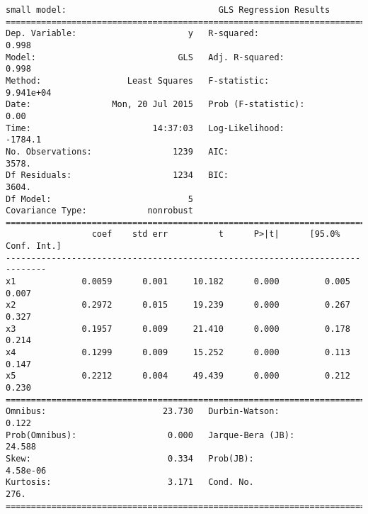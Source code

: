 \documentclass{article}
\begin{document}
\begin{verbatim}
small model:                              GLS Regression Results                            
==============================================================================
Dep. Variable:                      y   R-squared:                       0.998
Model:                            GLS   Adj. R-squared:                  0.998
Method:                 Least Squares   F-statistic:                 9.941e+04
Date:                Mon, 20 Jul 2015   Prob (F-statistic):               0.00
Time:                        14:37:03   Log-Likelihood:                -1784.1
No. Observations:                1239   AIC:                             3578.
Df Residuals:                    1234   BIC:                             3604.
Df Model:                           5                                         
Covariance Type:            nonrobust                                         
==============================================================================
                 coef    std err          t      P>|t|      [95.0% Conf. Int.]
------------------------------------------------------------------------------
x1             0.0059      0.001     10.182      0.000         0.005     0.007
x2             0.2972      0.015     19.239      0.000         0.267     0.327
x3             0.1957      0.009     21.410      0.000         0.178     0.214
x4             0.1299      0.009     15.252      0.000         0.113     0.147
x5             0.2212      0.004     49.439      0.000         0.212     0.230
==============================================================================
Omnibus:                       23.730   Durbin-Watson:                   0.122
Prob(Omnibus):                  0.000   Jarque-Bera (JB):               24.588
Skew:                           0.334   Prob(JB):                     4.58e-06
Kurtosis:                       3.171   Cond. No.                         276.
==============================================================================


\end{verbatim}
\end{document}
